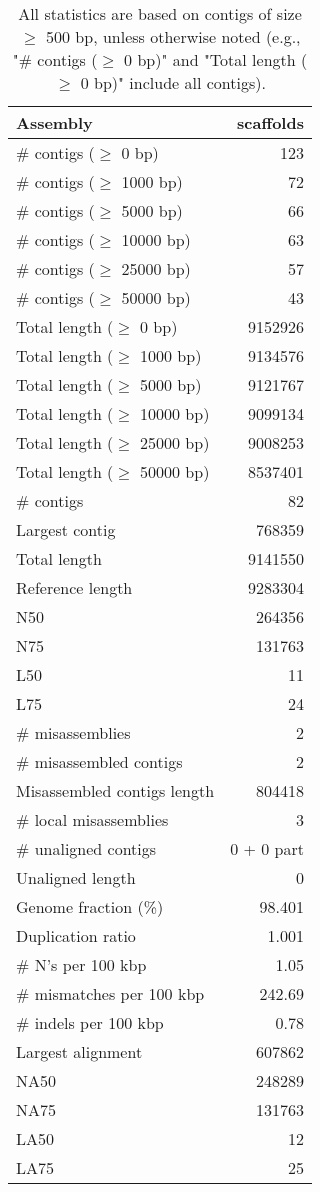 \documentclass[12pt,a4paper]{article}
\begin{document}
\begin{table}[ht]
\begin{center}
\caption{All statistics are based on contigs of size $\geq$ 500 bp, unless otherwise noted (e.g., "\# contigs ($\geq$ 0 bp)" and "Total length ($\geq$ 0 bp)" include all contigs).}
\begin{tabular}{|l*{1}{|r}|}
\hline
Assembly & scaffolds \\ \hline
\# contigs ($\geq$ 0 bp) & 123 \\ \hline
\# contigs ($\geq$ 1000 bp) & 72 \\ \hline
\# contigs ($\geq$ 5000 bp) & 66 \\ \hline
\# contigs ($\geq$ 10000 bp) & 63 \\ \hline
\# contigs ($\geq$ 25000 bp) & 57 \\ \hline
\# contigs ($\geq$ 50000 bp) & 43 \\ \hline
Total length ($\geq$ 0 bp) & 9152926 \\ \hline
Total length ($\geq$ 1000 bp) & 9134576 \\ \hline
Total length ($\geq$ 5000 bp) & 9121767 \\ \hline
Total length ($\geq$ 10000 bp) & 9099134 \\ \hline
Total length ($\geq$ 25000 bp) & 9008253 \\ \hline
Total length ($\geq$ 50000 bp) & 8537401 \\ \hline
\# contigs & 82 \\ \hline
Largest contig & 768359 \\ \hline
Total length & 9141550 \\ \hline
Reference length & 9283304 \\ \hline
N50 & 264356 \\ \hline
N75 & 131763 \\ \hline
L50 & 11 \\ \hline
L75 & 24 \\ \hline
\# misassemblies & 2 \\ \hline
\# misassembled contigs & 2 \\ \hline
Misassembled contigs length & 804418 \\ \hline
\# local misassemblies & 3 \\ \hline
\# unaligned contigs & 0 + 0 part \\ \hline
Unaligned length & 0 \\ \hline
Genome fraction (\%) & 98.401 \\ \hline
Duplication ratio & 1.001 \\ \hline
\# N's per 100 kbp & 1.05 \\ \hline
\# mismatches per 100 kbp & 242.69 \\ \hline
\# indels per 100 kbp & 0.78 \\ \hline
Largest alignment & 607862 \\ \hline
NA50 & 248289 \\ \hline
NA75 & 131763 \\ \hline
LA50 & 12 \\ \hline
LA75 & 25 \\ \hline
\end{tabular}
\end{center}
\end{table}
\end{document}
